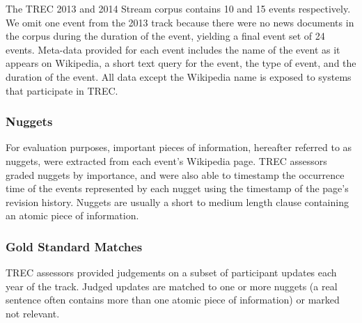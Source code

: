 The TREC 2013 and 2014 Stream corpus contains  10 and 15 events respectively. We omit
one event from the 2013 track because there were no news documents in the 
corpus during the duration of the event, yielding a final event set of 24 
events. Meta-data provided for each event includes the name of the event
as it appears on Wikipedia, a short text query for the event, 
the type of event, and the 
duration of the event.
All data except the Wikipedia name is exposed to
systems that participate in TREC.

\subsubsection{Nuggets}
For evaluation purposes, important pieces of information, hereafter 
referred to as nuggets, were extracted from each event's Wikipedia page.
TREC assessors graded nuggets by importance, and were also able to timestamp
the occurrence time of the events represented by each nugget
using the timestamp of the page's revision history. Nuggets are 
usually a short to medium length clause containing an atomic piece of
information.

\subsubsection{Gold Standard Matches}
TREC assessors provided judgements on a subset of participant updates each year
of the track. Judged updates are matched to one or more nuggets (a real 
sentence often contains more than one atomic piece of information) or marked
not relevant.

